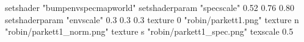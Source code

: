 setshader "bumpenvspecmapworld"
setshaderparam "specscale" 0.52 0.76 0.80
setshaderparam "envscale"  0.3 0.3 0.3
   texture 0 "robin/parkett1.png"
   texture n "robin/parkett1_norm.png"
   texture s "robin/parkett1_spec.png"
texscale 0.5